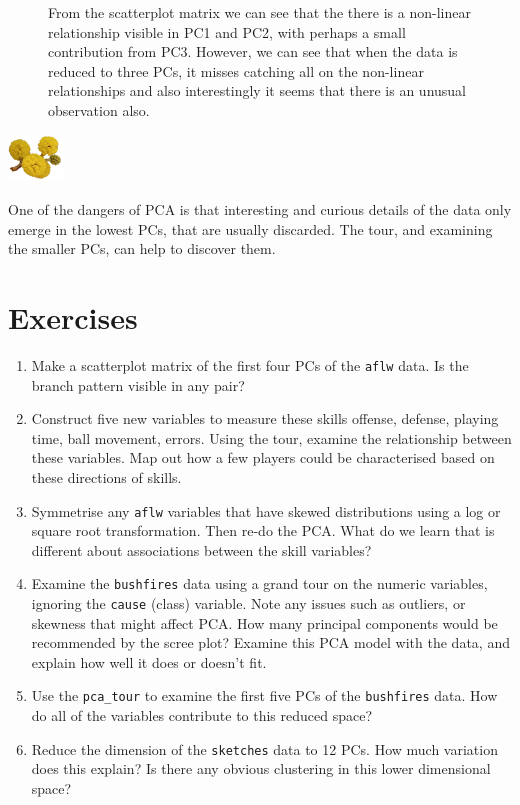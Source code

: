 \documentclass[
  letterpaper,
]{krantz}
\providecommand{\tightlist}{%
  \setlength{\itemsep}{0pt}\setlength{\parskip}{0pt}}\usepackage{longtable,booktabs,array}
\newcommand{\infobox}[1]{%
\noindent\colorbox{info!30}{%
\begin{minipage}{0.98\linewidth}%
    \centering%
    \begin{minipage}[c]{0.15\linewidth} %
      \includegraphics[width=1.5cm]{images/mulga-flowers2.png} %
    \end{minipage}%
    \hfill %
    \begin{minipage}[c]{0.8\linewidth} %
      \bigskip%
      \textsf{#1}%
      \bigskip%
    \end{minipage}%
    \hspace*{3mm}%
  \end{minipage}%
}%
}
\begin{document}
\begin{figure}


\caption{\label{fig-plane-nonlin-pairs}From the scatterplot matrix we
can see that the there is a non-linear relationship visible in PC1 and
PC2, with perhaps a small contribution from PC3. However, we can see
that when the data is reduced to three PCs, it misses catching all on
the non-linear relationships and also interestingly it seems that there
is an unusual observation also.}

\end{figure}%

\infobox{One of the dangers of PCA is that interesting and curious details of the data only emerge in the lowest PCs, that are usually discarded. The tour, and examining the smaller PCs, can help to discover them.}

\section*{Exercises}\label{exercises-3}


\begin{enumerate}
\def\labelenumi{\arabic{enumi}.}
\tightlist
\item
  Make a scatterplot matrix of the first four PCs of the \texttt{aflw}
  data. Is the branch pattern visible in any pair?
\item
  Construct five new variables to measure these skills offense, defense,
  playing time, ball movement, errors. Using the tour, examine the
  relationship between these variables. Map out how a few players could
  be characterised based on these directions of skills.
\item
  Symmetrise any \texttt{aflw} variables that have skewed distributions
  using a log or square root transformation. Then re-do the PCA. What do
  we learn that is different about associations between the skill
  variables?
\item
  Examine the \texttt{bushfires} data using a grand tour on the numeric
  variables, ignoring the \texttt{cause} (class) variable. Note any
  issues such as outliers, or skewness that might affect PCA. How many
  principal components would be recommended by the scree plot? Examine
  this PCA model with the data, and explain how well it does or doesn't
  fit.
\item
  Use the \texttt{pca\_tour} to examine the first five PCs of the
  \texttt{bushfires} data. How do all of the variables contribute to
  this reduced space?
\item
  Reduce the dimension of the \texttt{sketches} data to 12 PCs. How much
  variation does this explain? Is there any obvious clustering in this
  lower dimensional space?
\end{enumerate}
\end{document}
